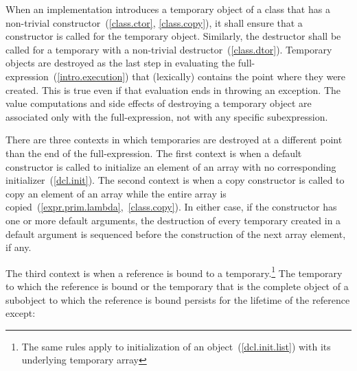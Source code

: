 \pnum
{}%
%
%
When an implementation introduces a temporary object of a class that has a
non-trivial constructor~(\ref{class.ctor}, \ref{class.copy}), it shall ensure that
a constructor is called for the temporary object.
Similarly, the destructor shall be called for a temporary with a non-trivial
destructor~(\ref{class.dtor}).
Temporary objects are destroyed as the last step
in evaluating
the full-expression~(\ref{intro.execution})
that (lexically) contains the point where
they were created.
This is true even if that evaluation ends in throwing an exception.
The
%
value computations and
%
side effects of destroying a temporary object
are associated only with the full-expression, not with any specific
subexpression.

\pnum
{}%
%
There are three contexts in which temporaries are destroyed at a different
point than the end of the full-expression.
The first context is when a default constructor is called to initialize
an element of an array with no corresponding initializer~(\ref{dcl.init}).
The second context is when a copy constructor is called to copy an element of
an array while the entire array is copied~(\ref{expr.prim.lambda},~\ref{class.copy}).
In either case, if the constructor has one or more default arguments,
the destruction of every temporary created in a default argument is
sequenced before the construction of the next array element, if any.

\pnum
The third context is when a reference is bound to a
temporary.\footnote{The same rules apply to initialization of an
   object~(\ref{dcl.init.list}) with its
  underlying temporary array}
The temporary to which the reference is bound or the temporary
that is the complete object of a subobject to which the reference is bound
persists for the lifetime of the reference except:

